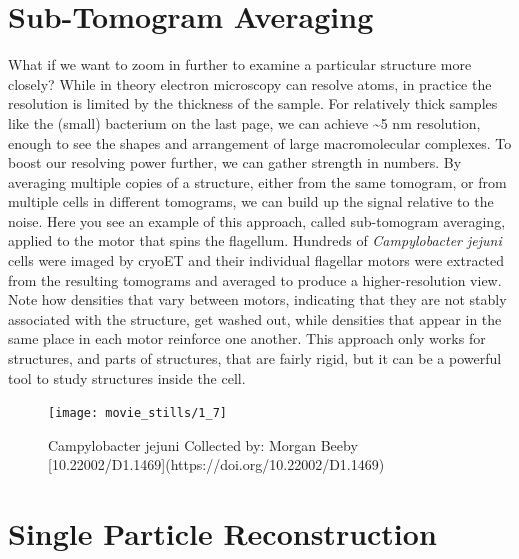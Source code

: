 \documentclass[]{tufte-book}
\begin{document}
\section{Sub-Tomogram Averaging}\label{sub-tomogram-averaging}

What if we want to zoom in further to examine a particular structure
more closely? While in theory electron microscopy can resolve atoms, in
practice the resolution is limited by the thickness of the sample. For
relatively thick samples like the (small) bacterium on the last page, we
can achieve \textasciitilde{}5 nm resolution, enough to see the shapes
and arrangement of large macromolecular complexes. To boost our
resolving power further, we can gather strength in numbers. By averaging
multiple copies of a structure, either from the same tomogram, or from
multiple cells in different tomograms, we can build up the signal
relative to the noise. Here you see an example of this approach, called
sub-tomogram averaging, applied to the motor that spins the flagellum.
Hundreds of \emph{Campylobacter jejuni} cells were imaged by cryoET and
their individual flagellar motors were extracted from the resulting
tomograms and averaged to produce a higher-resolution view. Note how
densities that vary between motors, indicating that they are not stably
associated with the structure, get washed out, while densities that
appear in the same place in each motor reinforce one another. This
approach only works for structures, and parts of structures, that are
fairly rigid, but it can be a powerful tool to study structures inside
the cell.

\begin{figure}
\texttt{[image: movie\_stills/1\_7]} \caption[Campylobacter jejuni Collected by]{Campylobacter jejuni Collected by: Morgan Beeby [10.22002/D1.1469](https://doi.org/10.22002/D1.1469)}\label{fig:unnamed-chunk-11}
\end{figure}

\section{Single Particle
Reconstruction}\label{single-particle-reconstruction}
\end{document}
